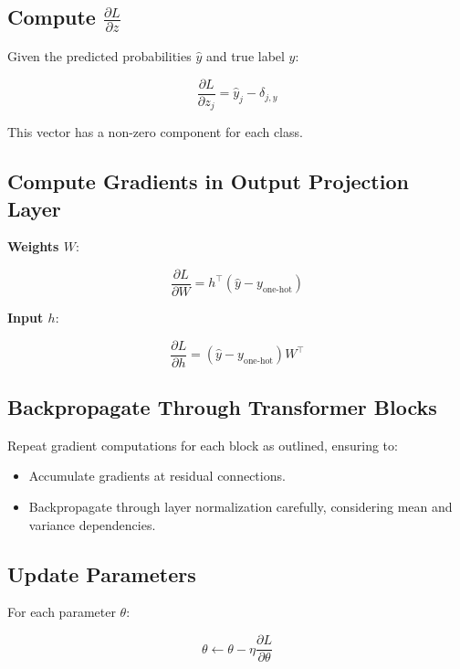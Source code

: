 \documentclass{article}
\begin{document}
\subsection{Compute $\frac{\partial L}{\partial z}$}

Given the predicted probabilities $\hat{y}$ and true label $y$:

\begin{equation}
    \frac{\partial L}{\partial z_j} = \hat{y}_j - \delta_{j, y}
\end{equation}

This vector has a non-zero component for each class.

\subsection{Compute Gradients in Output Projection Layer}

\textbf{Weights $W$}:

\begin{equation}
    \frac{\partial L}{\partial W} = h^\top (\hat{y} - y_{\text{one-hot}})
\end{equation}

\textbf{Input $h$}:

\begin{equation}
    \frac{\partial L}{\partial h} = (\hat{y} - y_{\text{one-hot}}) W^\top
\end{equation}

\subsection{Backpropagate Through Transformer Blocks}

Repeat gradient computations for each block as outlined, ensuring to:

\begin{itemize}
    \item Accumulate gradients at residual connections.
    \item Backpropagate through layer normalization carefully, considering mean and variance dependencies.
\end{itemize}

\subsection{Update Parameters}

For each parameter $\theta$:

\begin{equation}
    \theta \leftarrow \theta - \eta \frac{\partial L}{\partial \theta}
\end{equation}
\end{document}
